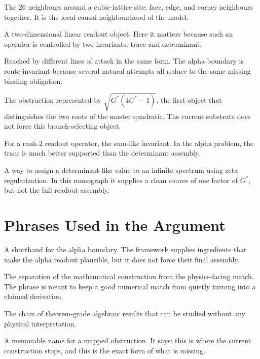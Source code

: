 \begin{termnotes}
  \item[Moore neighbourhood.]
  The 26 neighbours around a cubic-lattice site: face, edge, and corner
  neighbours together. It is the local causal neighbourhood of the model.

  \item[Rank-2 operator.]
  A two-dimensional linear readout object. Here it matters because such an
  operator is controlled by two invariants: trace and determinant.

  \item[Route-invariant.]
  Reached by different lines of attack in the same form. The alpha boundary is
  route-invariant because several natural attempts all reduce to the same
  missing binding obligation.

  \item[Square-root wall.]
  The obstruction represented by $\sqrt{G^*(4G^*-1)}$, the first object that
  distinguishes the two roots of the master quadratic. The current substrate
  does not force this branch-selecting object.

  \item[Trace.]
  For a rank-2 readout operator, the sum-like invariant. In the alpha problem,
  the trace is much better supported than the determinant assembly.

  \item[Zeta-regularized determinant.]
  A way to assign a determinant-like value to an infinite spectrum using zeta
  regularization. In this monograph it supplies a clean source of one factor of
  $G^*$, but not the full readout assembly.
\end{termnotes}

\section*{Phrases Used in the Argument}

\begin{termnotes}
  \item[The menu but not the dish.]
  A shorthand for the alpha boundary. The framework supplies ingredients that
  make the alpha readout plausible, but it does not force their final assembly.

  \item[Physics quarantine.]
  The separation of the mathematical construction from the physics-facing match.
  The phrase is meant to keep a good numerical match from quietly turning into a
  claimed derivation.

  \item[The spine.]
  The chain of theorem-grade algebraic results that can be studied without any
  physical interpretation.

  \item[The wall.]
  A memorable name for a mapped obstruction. It says: this is where the current
  construction stops, and this is the exact form of what is missing.
\end{termnotes}

